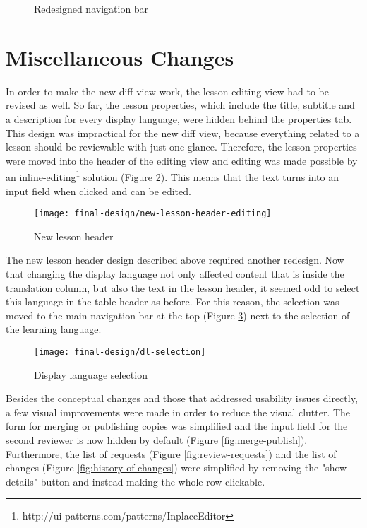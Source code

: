 \begin{figure}[h!]
 \centering
 \caption{Redesigned navigation bar}
 \label{fig:redesigned-nav}
\end{figure}

\section{Miscellaneous Changes}
In order to make the new diff view work, the lesson editing view had to be revised as well. So far, the lesson properties, which include the title, subtitle and a description for every display language, were hidden behind the properties tab. This design was impractical for the new diff view, because everything related to a lesson should be reviewable with just one glance. Therefore, the lesson properties were moved into the header of the editing view and editing was made possible by an inline-editing\footnote{http://ui-patterns.com/patterns/InplaceEditor} solution (Figure \ref{fig:new-lesson-header}). This means that the text turns into an input field when clicked and can be edited.

\begin{figure}[h!]
 \centering
 \texttt{[image: final-design/new-lesson-header-editing]}
 \caption{New lesson header}
 \label{fig:new-lesson-header}
\end{figure}

The new lesson header design described above required another redesign. Now that changing the display language not only affected content that is inside the translation column, but also the text in the lesson header, it seemed odd to select this language in the table header as before. For this reason, the selection was moved to the main navigation bar at the top (Figure \ref{fig:dl-selection}) next to the selection of the learning language.

\begin{figure}[h!]
 \centering
 \texttt{[image: final-design/dl-selection]}
 \caption{Display language selection}
 \label{fig:dl-selection}
\end{figure}

Besides the conceptual changes and those that addressed usability issues directly, a few visual improvements were made in order to reduce the visual clutter. The form for merging or publishing copies was simplified and the input field for the second reviewer is now hidden by default (Figure \ref{fig:merge-publish}). Furthermore, the list of requests (Figure \ref{fig:review-requests}) and the list of changes (Figure \ref{fig:history-of-changes}) were simplified by removing the "show details" button and instead making the whole row clickable.

